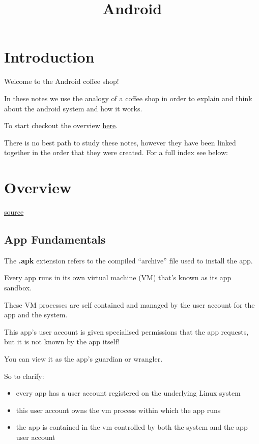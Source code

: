 \documentclass[12pt,notitlepage]{article}
\begin{document}
\title{Android}
\author{}
\date{}
\maketitle


\section{Introduction}

Welcome to the Android coffee shop!

In these notes we use the analogy of a coffee shop in order to explain and
think about the android system and how it works.

To start checkout the overview \hyperref[sec:overview]{here}.

There is no best path to study these notes, however they have been linked
together in the order that they were created. For a full index see below:


\section{Overview}\label{sec:overview}

\href{https://developer.android.com/guide/index.html}{source}

\subsection{App Fundamentals}

The \textbf{.apk} extension refers to the compiled ``archive'' file used to install the
app.

Every app runs in its own virtual machine (VM) that's known as its app sandbox.


These VM processes are self contained and managed by the user account for the
app and the system.

This app's user account is given specialised permissions that the app requests,
but it is not known by the app itself!

You can view it as the app's guardian or wrangler.

So to clarify:
\begin{itemize}
    \item every app has a user account registered on the underlying Linux system
    \item this user account owns the vm process within which the app runs
    \item the app is contained in the vm controlled by both the system and the app user account
\end{itemize}
\end{document}

